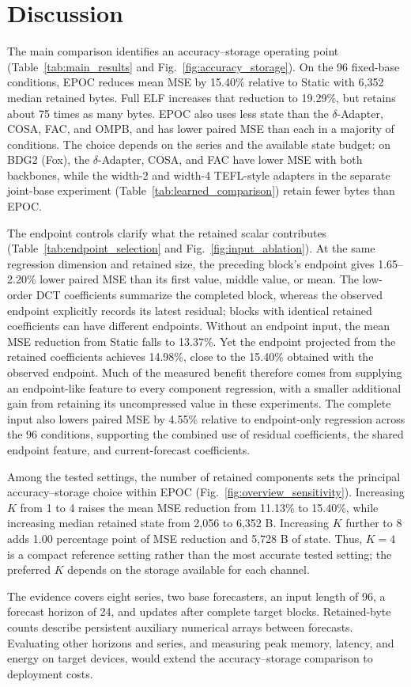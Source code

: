 \section{Discussion}
\label{sec:discussion}

The main comparison identifies an accuracy--storage operating point (Table~\ref{tab:main_results} and Fig.~\ref{fig:accuracy_storage}). On the 96 fixed-base conditions, EPOC reduces mean MSE by 15.40\% relative to Static with 6,352 median retained bytes. Full ELF increases that reduction to 19.29\%, but retains about 75 times as many bytes. EPOC also uses less state than the $\delta$-Adapter, COSA, FAC, and OMPB, and has lower paired MSE than each in a majority of conditions. The choice depends on the series and the available state budget: on BDG2 (Fox), the $\delta$-Adapter, COSA, and FAC have lower MSE with both backbones, while the width-2 and width-4 TEFL-style adapters in the separate joint-base experiment (Table~\ref{tab:learned_comparison}) retain fewer bytes than EPOC.

The endpoint controls clarify what the retained scalar contributes (Table~\ref{tab:endpoint_selection} and Fig.~\ref{fig:input_ablation}). At the same regression dimension and retained size, the preceding block's endpoint gives 1.65--2.20\% lower paired MSE than its first value, middle value, or mean. The low-order DCT coefficients summarize the completed block, whereas the observed endpoint explicitly records its latest residual; blocks with identical retained coefficients can have different endpoints. Without an endpoint input, the mean MSE reduction from Static falls to 13.37\%. Yet the endpoint projected from the retained coefficients achieves 14.98\%, close to the 15.40\% obtained with the observed endpoint. Much of the measured benefit therefore comes from supplying an endpoint-like feature to every component regression, with a smaller additional gain from retaining its uncompressed value in these experiments. The complete input also lowers paired MSE by 4.55\% relative to endpoint-only regression across the 96 conditions, supporting the combined use of residual coefficients, the shared endpoint feature, and current-forecast coefficients.

Among the tested settings, the number of retained components sets the principal accuracy--storage choice within EPOC (Fig.~\ref{fig:overview_sensitivity}). Increasing $K$ from 1 to 4 raises the mean MSE reduction from 11.13\% to 15.40\%, while increasing median retained state from 2,056 to 6,352 B. Increasing $K$ further to 8 adds 1.00 percentage point of MSE reduction and 5,728 B of state. Thus, $K=4$ is a compact reference setting rather than the most accurate tested setting; the preferred $K$ depends on the storage available for each channel.

The evidence covers eight series, two base forecasters, an input length of 96, a forecast horizon of 24, and updates after complete target blocks. Retained-byte counts describe persistent auxiliary numerical arrays between forecasts. Evaluating other horizons and series, and measuring peak memory, latency, and energy on target devices, would extend the accuracy--storage comparison to deployment costs.
